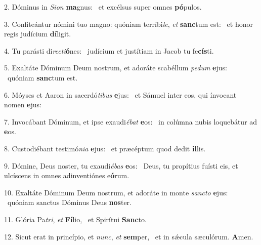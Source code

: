 2. Dóminus in \textit{Si}\textit{on} \textbf{ma}gnus: \ast\  et excélsus super omnes \textbf{pó}pulos.\

3. Confiteántur nómini tuo magno: quóniam terríbi\textit{le}, \textit{et} \textbf{sanc}tum est: \ast\  et honor regis judícium \textbf{dí}ligit.\

4. Tu parásti di\textit{rec}\textit{ti}\textbf{ó}nes: \ast\  judícium et justítiam in Jacob tu fe\textbf{cís}ti.\

5. Exaltáte Dóminum Deum nostrum, et adoráte scabéllum \textit{pe}\textit{dum} \textbf{e}jus: \ast\  quóniam \textbf{sanc}tum est.\

6. Móyses et Aaron in sacerdó\textit{ti}\textit{bus} \textbf{e}jus: \ast\  et Sámuel inter eos, qui ínvocant nomen \textbf{e}jus:\

7. Invocábant Dóminum, et ipse exaudi\textit{é}\textit{bat} \textbf{e}os: \ast\  in colúmna nubis loquebátur ad \textbf{e}os.\

8. Custodiébant testimó\textit{ni}\textit{a} \textbf{e}jus: \ast\  et præcéptum quod dedit \textbf{il}lis.\

9. Dómine, Deus noster, tu exaudi\textit{é}\textit{bas} \textbf{e}os: \ast\  Deus, tu propítius fuísti eis, et ulcíscens in omnes adinventiónes e\textbf{ó}rum.\

10. Exaltáte Dóminum Deum nostrum, et adoráte in monte \textit{sanc}\textit{to} \textbf{e}jus: \ast\  quóniam sanctus Dóminus Deus \textbf{nos}ter.\

11. Glória Pa\textit{tri}, \textit{et} \textbf{Fí}lio, \ast\  et Spirítui \textbf{Sanc}to.\

12. Sicut erat in princípio, et \textit{nunc}, \textit{et} \textbf{sem}per, \ast\  et in sǽcula sæculórum. \textbf{A}men.\

